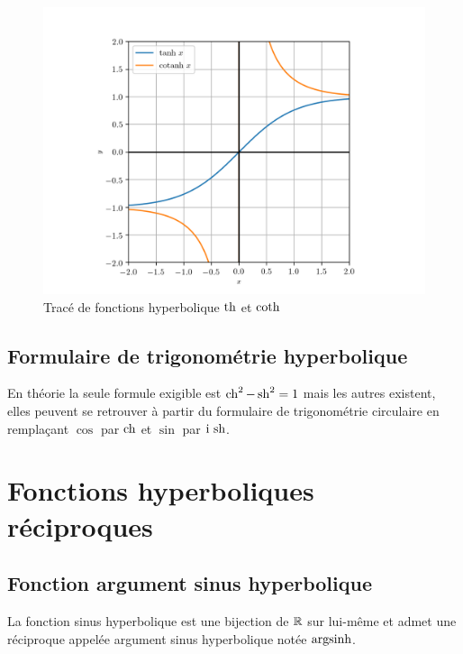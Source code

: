 \begin{figure}
  \centering
  \includegraphics[scale = 0.8]{tanh.png}
  \caption{Tracé de fonctions hyperbolique \(\operatorname{th}\) et
  \(\operatorname{coth}\)}\label{fig:tracetanhcoth}
\end{figure}

\subsection{Formulaire de trigonométrie
hyperbolique}\label{subsec:chap1-formulairetrigohyp}

En théorie la seule formule exigible est \(\operatorname{ch}^2-\operatorname{sh}^2 = 1\) mais les
autres existent, elles peuvent se retrouver à partir du formulaire de
trigonométrie circulaire en remplaçant \(\cos\) par \(\operatorname{ch}\) et \(\sin\) par
\(\operatorname{i}{}\operatorname{sh}\).

\section{Fonctions hyperboliques réciproques}\label{sec:chap1-fonctionshyprec}

\subsection{Fonction argument sinus
hyperbolique}\label{subsec:chap1-fonctionargsinh}

\begin{defdef}
  La fonction sinus hyperbolique est une bijection de \(\mathbb{R}\) sur lui-même et
  admet une réciproque appelée argument sinus hyperbolique notée \(\operatorname{argsinh}\).
\end{defdef}

